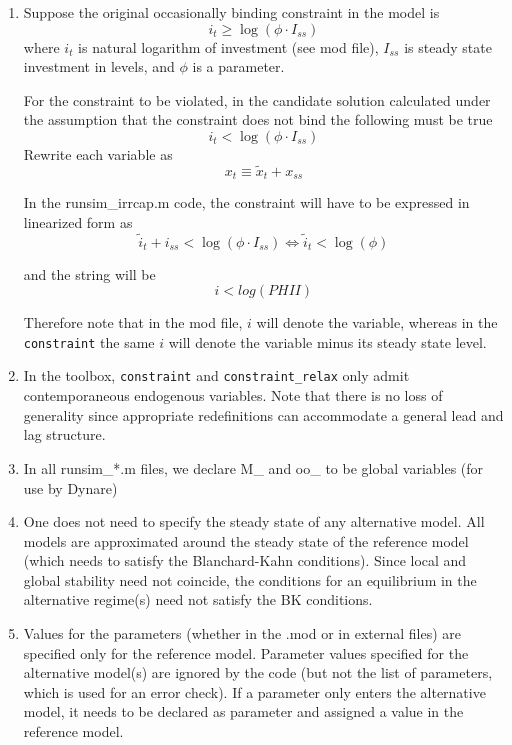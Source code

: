 \documentclass[12pt]{article}
\begin{document}
\begin{enumerate}
\item Suppose the original occasionally binding constraint in the model is 
\begin{equation*}
i_{t}\geq \log \left( \phi \cdot I_{ss}\right)
\end{equation*}%
where $i_{t}$ is natural logarithm of investment (see mod file), $I_{ss}$ is
steady state investment in levels, and $\phi $ is a parameter.

For the constraint to be violated, in the candidate solution calculated
under the assumption that the constraint does not bind the following must be
true%
\begin{equation*}
i_{t}<\log \left( \phi \cdot I_{ss}\right)
\end{equation*}%
Rewrite each variable as%
\begin{equation*}
x_{t}\equiv \widetilde{x}_{t}+x_{ss}
\end{equation*}

In the runsim\_irrcap.m code, the constraint will have to be expressed in
linearized form as%
\begin{equation*}
\widetilde{i}_{t}+i_{ss}<\log \left( \phi \cdot I_{ss}\right)
\Longleftrightarrow \widetilde{i}_{t}<\log \left( \phi \right)
\end{equation*}

and the string will be 
\begin{equation*}
i<log(PHII)
\end{equation*}

Therefore note that in the mod file, $i$ will denote the variable, whereas
in the \texttt{constraint} the same $i$ will denote the variable minus its
steady state level.

\item In the toolbox, \texttt{constraint} and \texttt{constraint\_relax}
only admit contemporaneous endogenous variables. Note that there is 
no loss of generality since appropriate redefinitions can accommodate a
general lead and lag structure.

\item In all runsim\_*.m files, we declare M\_ and oo\_ to be global
variables (for use by Dynare)

\item One does not need to specify the steady state of any alternative
model. All models are approximated around the steady state of the
reference model (which needs to satisfy the Blanchard-Kahn conditions). Since local and global stability need not coincide, the conditions for an equilibrium in the alternative regime(s) need not satisfy the BK conditions.

\item Values for the parameters (whether in the .mod or in external files) are specified only for the reference model. Parameter values
specified for the alternative model(s) are ignored by the code (but not the
list of parameters, which is used for an error check). If a parameter only enters the alternative model, it
needs to be declared as parameter and assigned a value in the reference
model.
\end{enumerate}
\end{document}
